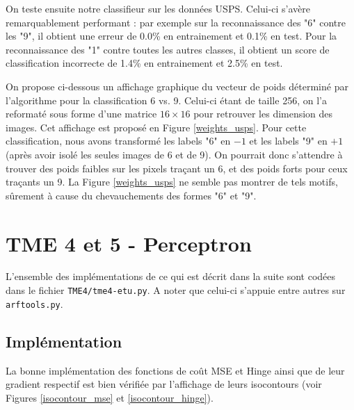 \documentclass[a4paper]{article}
\begin{document}
On teste ensuite notre classifieur sur les données USPS. Celui-ci s'avère remarquablement performant : par exemple sur la reconnaissance des "6" contre les "9", il obtient une erreur de 0.0\% en entrainement et 0.1\% en test. Pour la reconnaissance des "1" contre toutes les autres classes, il obtient un score de classification incorrecte de 1.4\% en entrainement et 2.5\% en test.

On propose ci-dessous un affichage graphique du vecteur de poids déterminé par l'algorithme pour la classification 6 vs. 9. Celui-ci étant de taille 256, on l'a reformaté sous forme d'une matrice $16 \times 16$ pour retrouver les dimension des images. Cet affichage est proposé en Figure \ref{weights_usps}. Pour cette classification, nous avons transformé les labels "6" en $-1$ et les labels "9" en $+1$ (après avoir isolé les seules images de 6 et de 9). On pourrait donc s'attendre à trouver des poids faibles sur les pixels traçant un 6, et des poids forts pour ceux traçants un 9. La Figure \ref{weights_usps} ne semble pas montrer de tels motifs, sûrement à cause du chevauchements des formes "6" et "9".

\section*{TME 4 et 5 - Perceptron}

L'ensemble des implémentations de ce qui est décrit dans la suite sont codées dans le fichier \verb!TME4/tme4-etu.py!. A noter que celui-ci s'appuie entre autres sur \verb!arftools.py!.

\subsection*{Implémentation}

La bonne implémentation des fonctions de coût MSE et Hinge ainsi que de leur gradient respectif est bien vérifiée par l'affichage de leurs isocontours (voir Figures \ref{isocontour_mse} et \ref{isocontour_hinge}).
\end{document}
